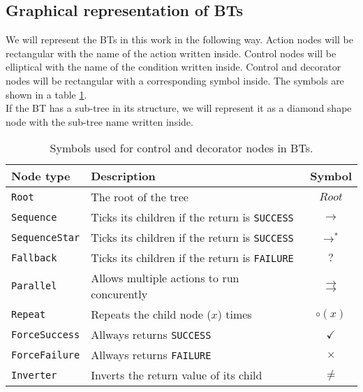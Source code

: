     \subsection{Graphical representation of BTs}
        We will represent the BTs in this work in the following way. Action nodes will be rectangular with the name of the action written inside. Control nodes will be elliptical with the name of the condition written inside. Control and decorator nodes will be rectangular with a corresponding symbol inside. The symbols are shown in a table \ref{tab:symbols}.\\
        If the BT has a sub-tree in its structure, we will represent it as a diamond shape node with the sub-tree name written inside.
        \begin{table}[H]
            \centering
            \begin{tabular}{|l|l|c|}
                \hline
                \textbf{Node type} & \textbf{Description} & \textbf{Symbol} \\
                \hline\hline
                \texttt{Root} & The root of the tree & $Root$ \\
                \hline
                \texttt{Sequence} & Ticks its children if the return is \texttt{SUCCESS} & $\to$ \\
                \hline
                \texttt{SequenceStar} & Ticks its children if the return is \texttt{SUCCESS} & $\to^{*}$ \\
                \hline
                \texttt{Fallback} & Ticks its children if the return is \texttt{FAILURE} & $?$ \\
                \hline
                \texttt{Parallel} & Allows multiple actions to run concurently & $\rightrightarrows$ \\
                \hline
                \texttt{Repeat} & Repeats the child node ($x$) times & $\circ(x)$ \\
                \hline
                \texttt{ForceSuccess} & Allways returns \texttt{SUCCESS} & $\checkmark$ \\
                \hline
                \texttt{ForceFailure} & Allways returns \texttt{FAILURE} & $\times$ \\
                \hline
                \texttt{Inverter} & Inverts the return value of its child & $\neq$ \\
                \hline
            \end{tabular}
            \caption{Symbols used for control and decorator nodes in BTs.}
            \label{tab:symbols}
        \end{table}
    

